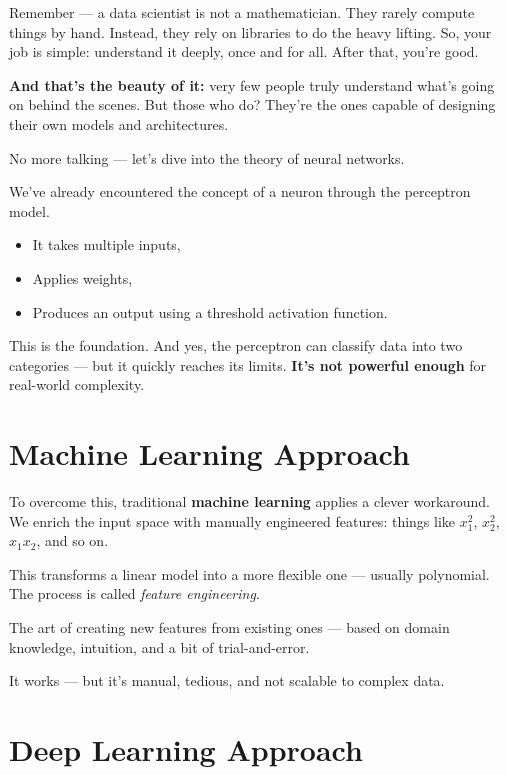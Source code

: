 \documentclass[11pt]{article}
\begin{document}
Remember --- a data scientist is not a mathematician.
They rarely compute things by hand. Instead, they rely on libraries to do the heavy lifting.
So, your job is simple: understand it deeply, once and for all. After that, you're good.

\textbf{And that's the beauty of it:} very few people truly understand what's going on behind the scenes.
But those who do? They're the ones capable of designing their own models and architectures.

\begin{actionbox}[title=Let's Begin]
No more talking --- let's dive into the theory of neural networks.
\end{actionbox}

We’ve already encountered the concept of a neuron through the perceptron model.

\begin{itemize}
  \item It takes multiple inputs,
  \item Applies weights,
  \item Produces an output using a threshold activation function.
\end{itemize}

This is the foundation.  
And yes, the perceptron can classify data into two categories — but it quickly reaches its limits.  
\textbf{It’s not powerful enough} for real-world complexity.

\section{Machine Learning Approach}

To overcome this, traditional \textbf{machine learning} applies a clever workaround.  
We enrich the input space with manually engineered features: things like $x_1^2$, $x_2^2$, $x_1x_2$, and so on.

This transforms a linear model into a more flexible one — usually polynomial.  
The process is called \textit{feature engineering}.

\begin{warnbox}[title=Feature Engineering]
The art of creating new features from existing ones — based on domain knowledge, intuition, and a bit of trial-and-error.
\end{warnbox}

It works — but it’s manual, tedious, and not scalable to complex data.

\section{Deep Learning Approach}
\end{document}
